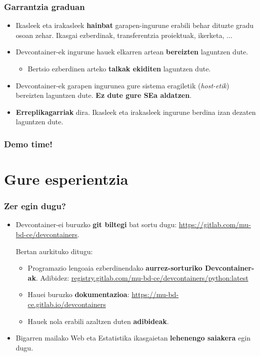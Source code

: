\documentclass[lang=eu,biz=foe,aspectratio=169,handout]{mupresentation}
\begin{document}
\begin{frame}
  \frametitle{Garrantzia graduan}
  \begin{itemize}
    \item Ikasleek eta irakasleek \textbf{hainbat} garapen-ingurune erabili behar dituzte gradu osoan zehar. Ikasgai ezberdinak, transferentzia proiektuak, ikerketa, ...
    \item Devcontainer-ek ingurune hauek elkarren artean \textbf{bereizten} laguntzen dute.
      \begin{itemize}
        \item Bertsio ezberdinen arteko \textbf{talkak ekiditen} laguntzen dute.
      \end{itemize}
    \item Devcontainer-ek garapen ingurunea gure sistema eragiletik (\textit{host-etik}) bereizten laguntzen dute. \textbf{Ez dute gure SEa aldatzen}.
    \item \textbf{Erreplikagarriak} dira. Ikasleek eta irakasleek ingurune berdina izan dezaten laguntzen dute.
  \end{itemize}
\end{frame}

\begin{frame}
  \frametitle{Demo time!}
\end{frame}

\section{Gure esperientzia}

\begin{frame}
  \frametitle{Zer egin dugu?}
  \begin{itemize}
    \item Devcontainer-ei buruzko \textbf{git biltegi} bat sortu dugu:
      \url{https://gitlab.com/mu-bd-ce/devcontainers}.

      Bertan aurkituko ditugu:
      \begin{itemize}
        \item Programazio lengoaia ezberdinendako \textbf{aurrez-sorturiko Devcontainer-ak}. Adibidez:
          \url{registry.gitlab.com/mu-bd-ce/devcontainers/python:latest}
        \item Hauei buruzko \textbf{dokumentazioa}:
          \url{https://mu-bd-ce.gitlab.io/devcontainers}
        \item Hauek nola erabili azaltzen duten \textbf{adibideak}.
      \end{itemize}
    \item Bigarren mailako Web eta Estatistika ikasgaietan \textbf{lehenengo saiakera} egin dugu.
  \end{itemize}
\end{frame}
\end{document}
